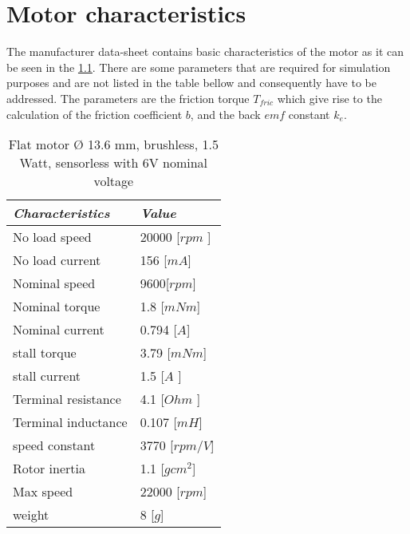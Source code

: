 \chapter{Motor characteristics}\label{chap: B}
%
The manufacturer data-sheet contains basic characteristics of the motor as it can be seen in the \ref{table:forfor}. There are some parameters that are required for simulation purposes and are not listed in the table bellow and consequently have to be addressed. The parameters are the friction torque $T_{fric}$ which give rise to the calculation of the friction coefficient $b$, and the back $emf$ constant $k_{e}$.     
%
\begin{table}[H]
	\centering
	\begin{tabular}{|l|l|}
		\hline
		\textit{\textbf{Characteristics}}  & \textit{\textbf{Value}}                     				\\ \hline
		No load speed                      & 20000 {[}$rpm$ {]}                      					\\ \hline
		No load current                    & 156 {[}$mA${]}                             				\\ \hline
		Nominal speed                     	& 9600{[}$rpm${]}                                         	\\ \hline
		Nominal torque                     		& 1.8 [$mNm$]                                    		\\ \hline
		Nominal current                  	      & 0.794 {[}$A${]}  	
		\\ \hline
		stall torque                  	      & 3.79 {[}$mNm${]}                               			\\ \hline
		stall current                   & 1.5 {[}$A$ {]}                                     		
		 \\ \hline
		Terminal resistance  & 4.1 {[}$Ohm$ {]}                            				
		\\ \hline
		Terminal inductance     & 0.107 {[}$mH${]}                           	  				
		\\ \hline
		speed constant             & 3770 {[}$rpm/V${]}   					    \\ \hline
		Rotor inertia & 1.1 {[}$gc m^{2}${]}                               	
		 \\ \hline
		 Max speed  & 22000 {[}$rpm${]}                               	
		 \\ \hline
		 weight  & 8 {[}$g${]}                               	
		 \\ \hline
	\end{tabular}
	\caption{Flat motor $Ø$ 13.6 mm, brushless, 1.5 Watt, sensorless with 6V nominal voltage}
	\label{table:forfor}
\end{table}
